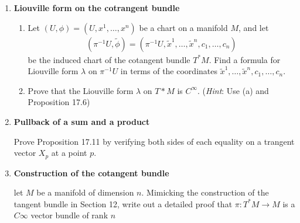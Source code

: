 \documentclass[12pt,a4paper]{report}
\newcommand{\RED}[1]{\textcolor{red}{#1}}
\newcommand{\BLUE}[1]{\textcolor{blue}{#1}}
\begin{document}
\begin{enumerate}[label=\textbf{17.\arabic*.}]
Multiplication in the unit circle $S^1$, viewed as a subset of the complex plane, is given by 
\begin{align*}
	e^{it}\cdot e^{iu} = e^{i(t+u)}, \, t,u \in \R
\end{align*}In terms of real imaginary parts, 
\begin{align*}
	(\cos t+i\sin t)(x+iy)= ((\cos t)x-(\sin t)y)+i((\sin t)x+(\cos t)y).
\end{align*}Hence, if $g=(\cos t, \sin t) \in S^1 \subset \R^2$, then the left multiplication $\ell_g:S^1\to S^1$ is given by 
\BLUE{\begin{align*}
	\ell_g(x,y) &= (\cos t + i\sin t)(x + iy) \\
	&= ((\cos t)x-(\sin t)y, (\sin t)x + (\cos t)y).
\end{align*}
}
Let $\omega = -ydx+xdy$ be the 1-form found in Example 17.15.  Prove that $\ell_g^*\omega = \omega$ for all $g \in S^1$.

\RED{By the definition page 136 of Lee
\begin{align*}
	(F^*\omega)(X) &= \omega(F_*X) \\
	(F_*X_p)f &= X_p(f\circ F)
\end{align*}then
\begin{align*}
	(\ell_g^*\omega)(X) &= X(\omega\circ \ell^*_g)
\end{align*}
}

\item \textbf{Liouville form on the cotrangent bundle}

\begin{enumerate}[label=(\alph*)]

	\item Let $(U, \phi)=(U, x^1,\dots, x^n)$ be a chart on a manifold $M$, and let 
	\begin{align*}
		(\pi^{-1}U, \tilde{\phi}) = (\pi^{-1}U, \tilde{x}^1,\dots,\tilde{x}^n, c_1,\dots,c_n)
	\end{align*}be the induced chart of the cotangent bundle $T^*M$.  Find a formula for Liouville form $\lambda$ on $\pi^{-1}U$ in terms of the coordinates $\tilde{x}^1,\dots,\tilde{x}^n,c_1,\dots,c_n$.
	
	\item Prove that the Liouville form $\lambda$ on $T*M$ is $C^\infty$. (\textit{Hint}: Use (a) and Proposition 17.6)

\end{enumerate}

\item \textbf{Pullback of a sum and a product}

Prove Proposition 17.11 by verifying both sides of each equality on a trangent vector $X_p$ at a point $p$.

\item \textbf{Construction of the cotangent bundle}

let $M$ be a manifold of dimension $n$.  Mimicking the construction of the tangent bundle in Section 12, write out a detailed proof that $\pi:T^*M\to M$ is a $C\infty$ vector bundle of rank $n$

\end{enumerate}
\end{document}
